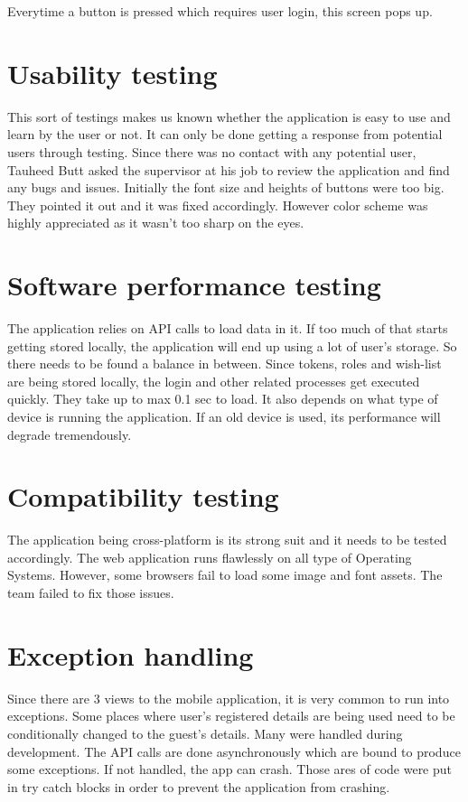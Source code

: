 Everytime a button is pressed which requires user login, this screen pops up.
\newpage
\section{Usability testing}
This sort of testings makes us known whether the application is easy to use and learn by the user or not. It can only be done getting a response from potential users through testing. Since there was no contact with any potential user, Tauheed Butt asked the supervisor at his job to review the application and find any bugs and issues. Initially the font size and heights of buttons were too big. They pointed it out and it was fixed accordingly. However color scheme was highly appreciated as it wasn't too sharp on the eyes.
\section{Software performance testing}
The application relies on API calls to load data in it. If too much of that starts getting stored locally, the application will end up using a lot of user's storage. So there needs to be found a balance in between. Since tokens, roles and wish-list are being stored locally, the login and other related processes get executed quickly. They take up to max 0.1 sec to load. It also depends on what type of device is running the application. If an old device is used, its performance will degrade tremendously.
\section{Compatibility testing}
The application being cross-platform is its strong suit and it needs to be tested accordingly. The web application runs flawlessly on all type of Operating Systems. However, some browsers fail to load some image and font assets. The team failed to fix those issues.
\section{Exception handling}
Since there are 3 views to the mobile application, it is very common to run into exceptions. Some places where user's registered details are being used need to be conditionally changed to the guest's details. Many were handled during development. The API calls are done asynchronously which are bound to produce some exceptions. If not handled, the app can crash. Those ares of code were put in try catch blocks in order to prevent the application from crashing.
